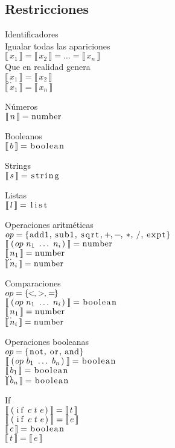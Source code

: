 \documentclass{article}
\newcommand{\cd}[1]{\text{\lstinline[columns=fixed]{#1}}}
\newcommand{\lbr}{\llbracket}
\newcommand{\rbr}{\rrbracket}
\newcommand{\typx}[1]{\lbr\, #1 \,\rbr}
\begin{document}
  \subsection{Restricciones}
  Identificadores\\
  Igualar todas las apariciones\\
  $\typx{x_1} = \typx{x_2} = \dots = \typx{x_n}$\\
  Que en realidad genera\\
  $\typx{x_1} = \typx{x_2}$\\
  $\dots$\\
  $\typx{x_1} = \typx{x_n}$

  Números\\
  $\typx{n} = \cd{number}$

  Booleanos\\
  $\typx{b} = \cd{boolean}$

  Strings\\
  $\typx{s} = \cd{string}$

  Listas\\
  $\typx{l} = \cd{list}$

  Operaciones aritméticas\\
  $op = \{\cd{add1},\,\cd{sub1},\,\cd{sqrt},\,\cd{+},\,\cd{-},\,\cd{*},\,\cd{/},\,\cd{expt}\}$\\
  $\typx{\cd{(}op\ n_1\ \dots\ n_i\cd{)}} = \cd{number}$\\
  $\typx{n_1} = \cd{number}$\\
  $\dots$\\
  $\typx{n_i} = \cd{number}$

  Comparaciones\\
  $op = \{\cd{<},\,\cd{>},\,\cd{=}\}$\\
  $\typx{\cd{(}op\ n_1\ \dots\ n_i\cd{)}} = \cd{boolean}$\\
  $\typx{n_1} = \cd{number}$\\
  $\dots$\\
  $\typx{n_i} = \cd{number}$

  Operaciones booleanas\\
  $op = \{\cd{not},\,\cd{or},\,\cd{and}\}$\\
  $\typx{\cd{(}op\ b_1\ \dots\ b_n\cd{)}} = \cd{boolean}$\\
  $\typx{b_1} = \cd{boolean}$\\
  $\dots$\\
  $\typx{b_n} = \cd{boolean}$

  If\\
  $\typx{\cd{(if}\ c\ t\ e\cd{)}} = \typx{t}$\\
  $\typx{\cd{(if}\ c\ t\ e\cd{)}} = \typx{e}$\\
  $\typx{c} = \cd{boolean}$\\
  $\typx{t} = \typx{e}$
  
\end{document}
